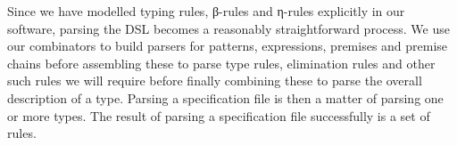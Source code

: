 {\begin{code}
\>[0]\AgdaSpace{}%
\AgdaSpace{}%
\AgdaSpace{}%
\AgdaSpace{}%
\AgdaSymbol{(}\AgdaSymbol{)}\<%
\\
\>[0]\AgdaSpace{}%
\AgdaSpace{}%
\AgdaSpace{}%
\<%
\\
\>[0]\AgdaSpace{}%
\AgdaSpace{}%
\<%
\\
\>[0]\AgdaSpace{}%
\AgdaSpace{}%
\AgdaSpace{}%
\AgdaSpace{}%
\<%
\\
\>[0]\AgdaSpace{}%
\<%
\\
\>[0]\AgdaSpace{}%
\<%
\end{code}
}

Since we have modelled typing rules, β-rules and η-rules explicitly in our
software, parsing the DSL becomes a reasonably straightforward process. We
use our combinators to build parsers for patterns, expressions, premises and
premise chains before assembling these to parse type rules, elimination rules
and other such rules we will require before finally combining these to parse the
overall description of a type. Parsing a specification file is then a matter
of parsing one or more types. The result of parsing a specification file
successfully is a set of rules.

